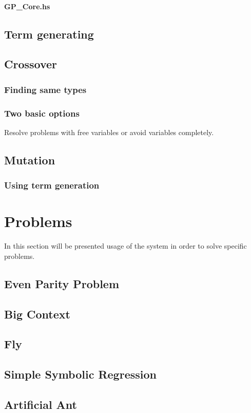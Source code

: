 \documentclass[12pt,a4paper]{report}
\begin{document}
		\subsubsection{ GP\_{}Core.hs }
\section{Term generating}
\section{Crossover}
	\subsection{Finding same types}
	\subsection{Two basic options}
	Resolve problems with free variables or avoid variables completely. 
	
\section{Mutation}
	\subsection{Using term generation}


\chapter{Problems}
	In this section will be presented usage of the system in order to solve specific problems.
		
	
		\section{Even Parity Problem}
		\section{Big Context}
		\section{Fly}
		\section{Simple Symbolic Regression}
		\section{Artificial Ant}
\end{document}
